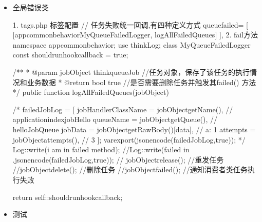 \documentclass[a4paper,10pt,english]{sphinxmanual}
\begin{document}
\begin{itemize}
\begin{itemize}
\item {} 
全局错误类

\begin{sphinxVerbatim}[commandchars=\\\{\}]
1. tags.php 标签配置
// 任务失败统一回调,有四种定义方式
\PYGZsq{}queue\PYGZus{}failed\PYGZsq{}=\PYGZgt{} [
            [\PYGZsq{}app\PYGZbs{}\PYGZbs{}common\PYGZbs{}\PYGZbs{}behavior\PYGZbs{}\PYGZbs{}MyQueueFailedLogger\PYGZsq{}, \PYGZsq{}logAllFailedQueues\PYGZsq{}]
        ],
2. fail方法
    namespace app\PYGZbs{}common\PYGZbs{}behavior;
    use think\PYGZbs{}Log;
    class MyQueueFailedLogger\PYGZob{}
        const should\PYGZus{}run\PYGZus{}hook\PYGZus{}callback = true;

        /**
         * @param \PYGZdl{}jobObject   \PYGZbs{}think\PYGZbs{}queue\PYGZbs{}Job   //任务对象，保存了该任务的执行情况和业务数据
         * @return bool     true                  //是否需要删除任务并触发其failed() 方法
         */
        public function logAllFailedQueues(\PYGZam{}\PYGZdl{}jobObject)\PYGZob{}

            /* \PYGZdl{}failedJobLog = [
                    \PYGZsq{}jobHandlerClassName\PYGZsq{}   =\PYGZgt{} \PYGZdl{}jobObject\PYGZhy{}\PYGZgt{}getName(), // \PYGZsq{}application\PYGZbs{}index\PYGZbs{}job\PYGZbs{}Hello\PYGZsq{}
                    \PYGZsq{}queueName\PYGZsq{} =\PYGZgt{} \PYGZdl{}jobObject\PYGZhy{}\PYGZgt{}getQueue(),             // \PYGZsq{}helloJobQueue\PYGZsq{}
                    \PYGZsq{}jobData\PYGZsq{}   =\PYGZgt{} \PYGZdl{}jobObject\PYGZhy{}\PYGZgt{}getRawBody()[\PYGZsq{}data\PYGZsq{}],  // \PYGZsq{}\PYGZob{}\PYGZsq{}a\PYGZsq{}: 1 \PYGZcb{}\PYGZsq{}
                    \PYGZsq{}attempts\PYGZsq{}  =\PYGZgt{} \PYGZdl{}jobObject\PYGZhy{}\PYGZgt{}attempts(),            // 3
            ];
            var\PYGZus{}export(json\PYGZus{}encode(\PYGZdl{}failedJobLog,true)); */
            Log::write(\PYGZdq{}i am in failed method\PYGZdq{});
            //Log::write(\PYGZdq{}failed in \PYGZdq{}.json\PYGZus{}encode(\PYGZdl{}failedJobLog,true));
            // \PYGZdl{}jobObject\PYGZhy{}\PYGZgt{}release();     //重发任务
            //\PYGZdl{}jobObject\PYGZhy{}\PYGZgt{}delete();         //删除任务
            //\PYGZdl{}jobObject\PYGZhy{}\PYGZgt{}failed();   //通知消费者类任务执行失败

            return self::should\PYGZus{}run\PYGZus{}hook\PYGZus{}callback;
        \PYGZcb{}
    \PYGZcb{}
\end{sphinxVerbatim}

\item {} 
测试


\end{itemize}
\end{itemize}
\end{document}
